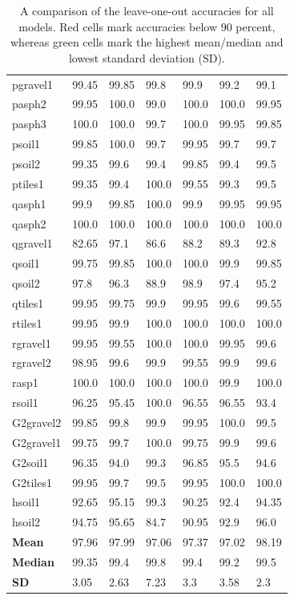 \begin{table}
\begin{center}
\begin{adjustbox}{totalheight=\baselineskip}
\begin{tabular}{|l|l|l|l|l|l|l|}
		pgravel1 & 99.45 & 99.85 & 99.8 & 99.9 & 99.2 & 99.1\\
		pasph2 & 99.95 & 100.0 & 99.0 & 100.0 & 100.0 & 99.95\\
		pasph3 & 100.0 & 100.0 & 99.7 & 100.0 & 99.95 & 99.85\\
		psoil1 & 99.85 & 100.0 & 99.7 & 99.95 & 99.7 & 99.7\\
		psoil2 & 99.35 & 99.6 & 99.4 & 99.85 & 99.4 & 99.5\\
		ptiles1 & 99.35 & 99.4 & 100.0 & 99.55 & 99.3 & 99.5\\
		qasph1 & 99.9 & 99.85 & 100.0 & 99.9 & 99.95 & 99.95\\
		qasph2 & 100.0 & 100.0 & 100.0 & 100.0 & 100.0 & 100.0\\
		qgravel1 & \cellcolor{red!20}82.65 & 97.1 & \cellcolor{red!20}86.6 & \cellcolor{red!20}88.2 & \cellcolor{red!20}89.3 & 92.8\\
		qsoil1 & 99.75 & 99.85 & 100.0 & 100.0 & 99.9 & 99.85\\
		qsoil2 & 97.8 & 96.3 & \cellcolor{red!20}88.9 & 98.9 & 97.4 & 95.2\\
		qtiles1 & 99.95 & 99.75 & 99.9 & 99.95 & 99.6 & 99.55\\
		rtiles1 & 99.95 & 99.9 & 100.0 & 100.0 & 100.0 & 100.0\\
		rgravel1 & 99.95 & 99.55 & 100.0 & 100.0 & 99.95 & 99.6\\
		rgravel2 & 98.95 & 99.6 & 99.9 & 99.55 & 99.9 & 99.6\\
		rasp1 & 100.0 & 100.0 & 100.0 & 100.0 & 99.9 & 100.0\\
		rsoil1 & 96.25 & 95.45 & 100.0 & 96.55 & 96.55 & 93.4\\
		G2gravel2 & 99.85 & 99.8 & 99.9 & 99.95 & 100.0 & 99.5\\
		G2gravel1 & 99.75 & 99.7 & 100.0 & 99.75 & 99.9 & 99.6\\
		G2soil1 & 96.35 & 94.0 & 99.3 & 96.85 & 95.5 & 94.6\\
		G2tiles1 & 99.95 & 99.7 & 99.5 & 99.95 & 100.0 & 100.0\\
		hsoil1 & 92.65 & 95.15 & 99.3 & 90.25 & 92.4 & 94.35\\
		hsoil2 & 94.75 & 95.65 & \cellcolor{red!20}84.7 & 90.95 & 92.9 & 96.0\\
		\hline
		\textbf{Mean} & 97.96 & 97.99 & 97.06 & 97.37 & 97.02 & \cellcolor{green!20}98.19\\
		\textbf{Median} & 99.35 & 99.4 & \cellcolor{green!20}99.8 & 99.4 & 99.2 & 99.5\\
		\textbf{SD} & 3.05 & 2.63 & 7.23 & 3.3 & 3.58 & \cellcolor{green!20}2.3\\
		\hline
		\end{tabular}
	\end{adjustbox}
	\end{center}
	\label{tab:loo}
	\caption{A comparison of the leave-one-out accuracies for all models. Red cells mark accuracies below 90 percent, whereas green cells mark the highest mean/median and lowest standard deviation (SD).}
\end{table}


